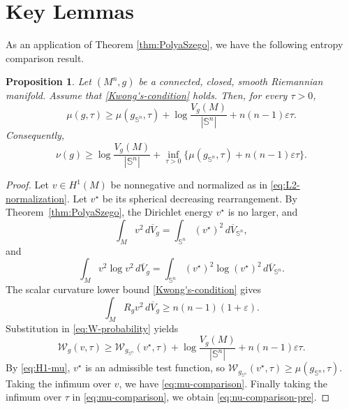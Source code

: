\documentclass[11pt, reqno]{amsart}
\numberwithin{equation}{section}
\newtheorem{proposition}[theorem]{Proposition}
\theoremstyle{remark}
\newcommand{\Sph}{\mathbb S}
\newcommand{\dbarV}[1]{d\overline V_{#1}}
\newcommand{\eps}{\varepsilon}
\newcommand{\W}{\mathcal{W}}
\begin{document}
\section{Key Lemmas}\label{keylemma}\label{sec:keylemma}
As an application of Theorem \ref{thm:PolyaSzego}, we have the following entropy comparison result.
\begin{proposition}\label{prop:entropy-comparison}
Let $(M^n, g)$ be a connected, closed, smooth Riemannian manifold. Assume that \eqref{Kwong's-condition} holds.  Then, for every
$\tau>0$,
\begin{equation}\label{eq:mu-comparison}
\mu(g,\tau)\geq\mu(g_{\Sph^n},\tau)+\log\frac{V_g(M)}{|\Sph^n|}+n(n-1)\eps\tau.
\end{equation}
Consequently,
\begin{equation}\label{eq:nu-comparison-pre}
\nu(g)\geq\log\frac {V_g(M)}{|\Sph^n|}
+\inf_{\tau>0}\{\mu(g_{\Sph^n},\tau)+n(n-1)\eps\tau\}.
\end{equation}
\end{proposition}

\begin{proof}
Let $v\in H^1(M)$ be nonnegative and normalized as in
\eqref{eq:L2-normalization}. Let $v^\star$ be its spherical decreasing rearrangement. By Theorem~\ref{thm:PolyaSzego}, the Dirichlet energy $v^\star$ is no larger, and
\begin{equation}\label{eq:entropy-equimeasurable-v}
\int_Mv^2\,\dbarV g
=\int_{\Sph^n}(v^\star)^2\,\dbarV {\Sph^n},
\end{equation}
and
\begin{equation}\label{eq:entropy-equimeasurable}
\int_Mv^2\log v^2\,\dbarV g
=\int_{\Sph^n}(v^\star)^2\log(v^\star)^2\,\dbarV {\Sph^n}.
\end{equation}
The scalar curvature lower bound \eqref{Kwong's-condition} gives
\begin{equation}\label{eq:scalar-lower-test}
\int_MR_gv^2\,\dbarV g\geq n(n-1)(1+\eps).
\end{equation}
Substitution in \eqref{eq:W-probability} yields
$$
\W_g(v,\tau)\geq \W_{g_{\Sph^n}}(v^\star,\tau)
+\log\frac{V_g(M)}{|\Sph^n|}+n(n-1)\eps\tau.
$$
By \eqref{eq:H1-mu}, $v^\star$ is an admissible test function, so
$\W_{g_{\Sph^n}}(v^\star,\tau)\geq\mu(g_{\Sph^n},\tau)$. Taking the
infimum over $v$, we have
\eqref{eq:mu-comparison}. Finally taking the infimum over $\tau$ in \eqref{eq:mu-comparison},  we obtain \eqref{eq:nu-comparison-pre}.
\end{proof}
\end{document}
